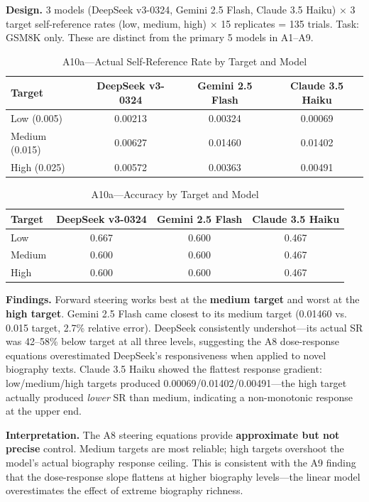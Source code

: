 \documentclass[11pt,a4paper]{article}
\begin{document}
\textbf{Design.} 3 models (DeepSeek v3-0324, Gemini 2.5 Flash, Claude 3.5 Haiku) $\times$ 3 target self-reference rates (low, medium, high) $\times$ 15 replicates = 135 trials. Task: GSM8K only. These are distinct from the primary 5 models in A1--A9.

\begin{table}[H]
\centering
\caption{A10a---Actual Self-Reference Rate by Target and Model}
\label{tab:a10a_sr}
\begin{tabular}{lccc}
\toprule
\textbf{Target} & \textbf{DeepSeek v3-0324} & \textbf{Gemini 2.5 Flash} & \textbf{Claude 3.5 Haiku} \\
\midrule
Low (0.005) & 0.00213 & 0.00324 & 0.00069 \\
Medium (0.015) & 0.00627 & 0.01460 & 0.01402 \\
High (0.025) & 0.00572 & 0.00363 & 0.00491 \\
\bottomrule
\end{tabular}
\end{table}

\begin{table}[H]
\centering
\caption{A10a---Accuracy by Target and Model}
\label{tab:a10a_acc}
\begin{tabular}{lccc}
\toprule
\textbf{Target} & \textbf{DeepSeek v3-0324} & \textbf{Gemini 2.5 Flash} & \textbf{Claude 3.5 Haiku} \\
\midrule
Low & 0.667 & 0.600 & 0.467 \\
Medium & 0.600 & 0.600 & 0.467 \\
High & 0.600 & 0.600 & 0.467 \\
\bottomrule
\end{tabular}
\end{table}

\textbf{Findings.} Forward steering works best at the \textbf{medium target} and worst at the \textbf{high target}. Gemini 2.5 Flash came closest to its medium target (0.01460 vs. 0.015 target, 2.7\% relative error). DeepSeek consistently undershot---its actual SR was 42--58\% below target at all three levels, suggesting the A8 dose-response equations overestimated DeepSeek's responsiveness when applied to novel biography texts. Claude 3.5 Haiku showed the flattest response gradient: low/medium/high targets produced 0.00069/0.01402/0.00491---the high target actually produced \textit{lower} SR than medium, indicating a non-monotonic response at the upper end.

\textbf{Interpretation.} The A8 steering equations provide \textbf{approximate but not precise} control. Medium targets are most reliable; high targets overshoot the model's actual biography response ceiling. This is consistent with the A9 finding that the dose-response slope flattens at higher biography levels---the linear model overestimates the effect of extreme biography richness.
\end{document}

